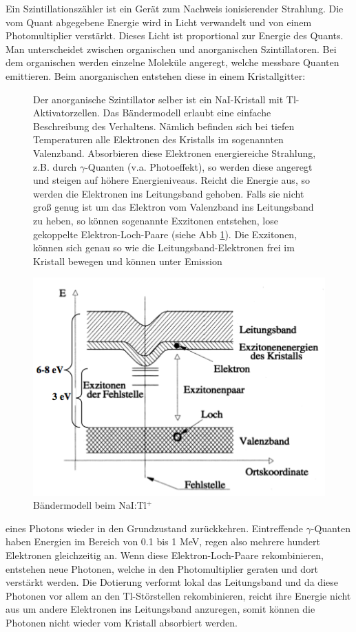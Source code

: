 Ein Szintillationszähler ist ein Gerät zum Nachweis ionisierender Strahlung. Die vom Quant abgegebene Energie wird in Licht verwandelt und von einem Photomultiplier verstärkt. Dieses Licht ist proportional zur Energie des Quants. Man unterscheidet zwischen organischen und anorganischen Szintillatoren. Bei dem organischen werden einzelne Moleküle angeregt, welche messbare Quanten emittieren. Beim anorganischen entstehen diese in einem Kristallgitter:

\begin{figure}[H]
	\begin{minipage}{0.45\textwidth}
	Der anorganische Szintillator selber ist ein NaI-Kristall mit Tl-Aktivatorzellen. Das Bändermodell erlaubt eine einfache Beschreibung des Verhaltens. Nämlich befinden sich bei tiefen Temperaturen alle Elektronen des Kristalls im sogenannten Valenzband. Absorbieren diese Elektronen energiereiche Strahlung, z.B. durch $\gamma$-Quanten (v.a. Photoeffekt), so werden diese angeregt und steigen auf höhere Energieniveaus. Reicht die Energie aus, so werden die Elektronen ins Leitungsband gehoben. Falls sie nicht groß genug ist um das Elektron vom Valenzband ins Leitungsband zu heben, so können sogenannte Exzitonen entstehen, lose gekoppelte Elektron-Loch-Paare (siehe Abb \ref{baendermodellszinti}). Die Exzitonen, können sich genau so wie die Leitungsband-Elektronen frei im Kristall bewegen und können unter Emission 
	\end{minipage}
	\begin{minipage}{0.54\textwidth}
	\centering \includegraphics[width=\textwidth]{Bilder/Bandmodell.png}
	\caption{Bändermodell beim NaI:Tl$^+$}
	\label{baendermodellszinti}
	\end{minipage}
\end{figure}
eines Photons wieder in den Grundzustand zurückkehren. Eintreffende $\gamma$-Quanten haben Energien im Bereich von 0.1 bis 1 MeV, regen also mehrere hundert Elektronen gleichzeitig an. Wenn diese Elektron-Loch-Paare rekombinieren, entstehen neue Photonen, welche in den Photomultiplier geraten und dort verstärkt werden. Die Dotierung verformt lokal das Leitungsband und da diese Photonen vor allem an den Tl-Störstellen rekombinieren, reicht ihre Energie nicht aus um andere Elektronen ins Leitungsband anzuregen, somit können die Photonen nicht wieder vom Kristall absorbiert werden.

